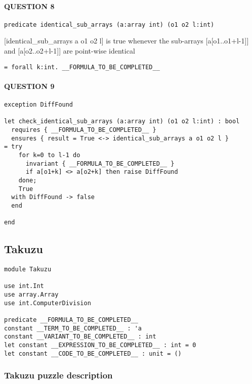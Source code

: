 \hypertarget{question-8}{%
\paragraph{QUESTION 8}\label{question-8}}

\begin{verbatim}
predicate identical_sub_arrays (a:array int) (o1 o2 l:int)
\end{verbatim}

{[}identical\_sub\_arrays a o1 o2 l{]} is true whenever the sub-arrays
{[}a{[}o1..o1+l-1{]}{]} and {[}a{[}o2..o2+l-1{]}{]} are point-wise
identical

\begin{verbatim}
= forall k:int. __FORMULA_TO_BE_COMPLETED__
\end{verbatim}

\hypertarget{question-9}{%
\paragraph{QUESTION 9}\label{question-9}}

\begin{verbatim}
exception DiffFound

let check_identical_sub_arrays (a:array int) (o1 o2 l:int) : bool
  requires { __FORMULA_TO_BE_COMPLETED__ }
  ensures { result = True <-> identical_sub_arrays a o1 o2 l }
= try
    for k=0 to l-1 do
      invariant { __FORMULA_TO_BE_COMPLETED__ }
      if a[o1+k] <> a[o2+k] then raise DiffFound
    done;
    True
  with DiffFound -> false
  end

end
\end{verbatim}

\hypertarget{takuzu}{%
\subsection{Takuzu}\label{takuzu}}

\begin{verbatim}
module Takuzu

use int.Int
use array.Array
use int.ComputerDivision

predicate __FORMULA_TO_BE_COMPLETED__
constant __TERM_TO_BE_COMPLETED__ : 'a
constant __VARIANT_TO_BE_COMPLETED__ : int
let constant __EXPRESSION_TO_BE_COMPLETED__ : int = 0
let constant __CODE_TO_BE_COMPLETED__ : unit = ()
\end{verbatim}

\hypertarget{takuzu-puzzle-description}{%
\subsubsection{Takuzu puzzle
description}\label{takuzu-puzzle-description}}

